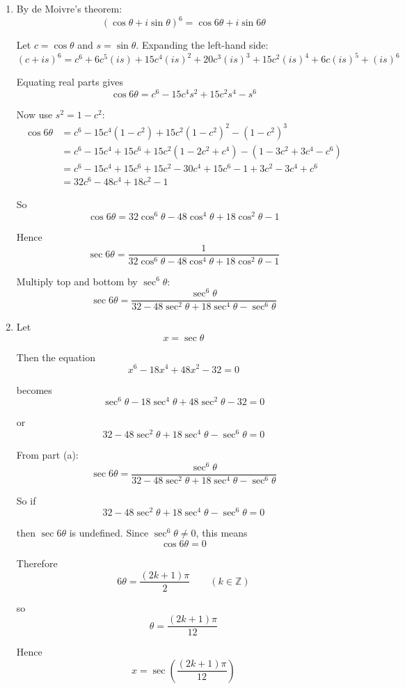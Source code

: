 \documentclass[leqno]{article}
\begin{document}
\begin{enumerate}[
  label=\textbf{\arabic*.},
  leftmargin=*,
  topsep=0pt,
  partopsep=0pt,
  parsep=0pt
]
\vspace*{10pt}

\begin{djsSolution}
\begin{enumerate}[label=\textbf{(\alph*)}]
  \item By de Moivre's theorem:
\[
(\cos\theta+i\sin\theta)^6=\cos 6\theta+i\sin 6\theta
\]

Let \(c=\cos\theta\) and \(s=\sin\theta\). Expanding the left-hand side:
\[
(c+is)^6=c^6+6c^5(is)+15c^4(is)^2+20c^3(is)^3+15c^2(is)^4+6c(is)^5+(is)^6
\]

Equating real parts gives
\[
\cos 6\theta=c^6-15c^4s^2+15c^2s^4-s^6
\]

Now use \(s^2=1-c^2\):
\begin{align*}
\cos 6\theta
&=c^6-15c^4(1-c^2)+15c^2(1-c^2)^2-(1-c^2)^3 \\
&=c^6-15c^4+15c^6+15c^2(1-2c^2+c^4)-(1-3c^2+3c^4-c^6) \\
&=c^6-15c^4+15c^6+15c^2-30c^4+15c^6-1+3c^2-3c^4+c^6 \\
&=32c^6-48c^4+18c^2-1
\end{align*}

So
\[
\cos 6\theta=32\cos^6\theta-48\cos^4\theta+18\cos^2\theta-1
\]

Hence
\[
\sec 6\theta=\frac{1}{32\cos^6\theta-48\cos^4\theta+18\cos^2\theta-1}
\]

Multiply top and bottom by \(\sec^6\theta\):
\[
\sec 6\theta
=\frac{\sec^6\theta}{32-48\sec^2\theta+18\sec^4\theta-\sec^6\theta}
\]

  \item Let
\[
x=\sec\theta
\]

Then the equation
\[
x^6-18x^4+48x^2-32=0
\]

becomes
\[
\sec^6\theta-18\sec^4\theta+48\sec^2\theta-32=0
\]

or
\[
32-48\sec^2\theta+18\sec^4\theta-\sec^6\theta=0
\]

From part (a):
\[
\sec 6\theta=\frac{\sec^6\theta}{32-48\sec^2\theta+18\sec^4\theta-\sec^6\theta}
\]

So if
\[
32-48\sec^2\theta+18\sec^4\theta-\sec^6\theta=0
\]

then \(\sec 6\theta\) is undefined. Since \(\sec^6\theta\neq 0\), this means
\[
\cos 6\theta=0
\]

Therefore
\[
6\theta=\frac{(2k+1)\pi}{2}\qquad (k\in\mathbb{Z})
\]

so
\[
\theta=\frac{(2k+1)\pi}{12}
\]

Hence
\[
x=\sec\left(\frac{(2k+1)\pi}{12}\right)
\]


\end{enumerate}
\end{djsSolution}
\end{enumerate}
\end{document}
